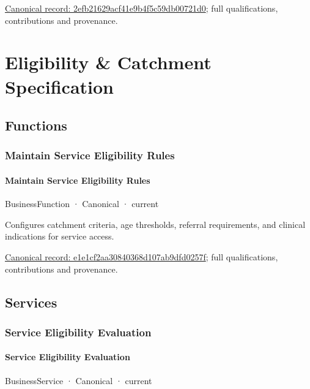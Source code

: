 {\footnotesize \href{../../../../continuum/business/business-service/2efb21629acf41e9b4f5c59db00721d0.md}{Canonical record: 2efb21629acf41e9b4f5c59db00721d0}; full qualifications, contributions and provenance.}\par
\section{Eligibility \& Catchment Specification}

\subsection{Functions}

\subsubsection{Maintain Service Eligibility Rules}

\paragraph{Maintain Service Eligibility Rules}

\label{element:e1e1cf2aa30840368d107ab9dfd0257f}
{\small BusinessFunction · Canonical · current}\par

Configures catchment criteria, age thresholds, referral requirements, and clinical indications for service access.


{\footnotesize \href{../../../../continuum/business/business-function/e1e1cf2aa30840368d107ab9dfd0257f.md}{Canonical record: e1e1cf2aa30840368d107ab9dfd0257f}; full qualifications, contributions and provenance.}\par
\subsection{Services}

\subsubsection{Service Eligibility Evaluation}

\paragraph{Service Eligibility Evaluation}

\label{element:7e005ce374f347088ae854442fc3edef}
{\small BusinessService · Canonical · current}\par

